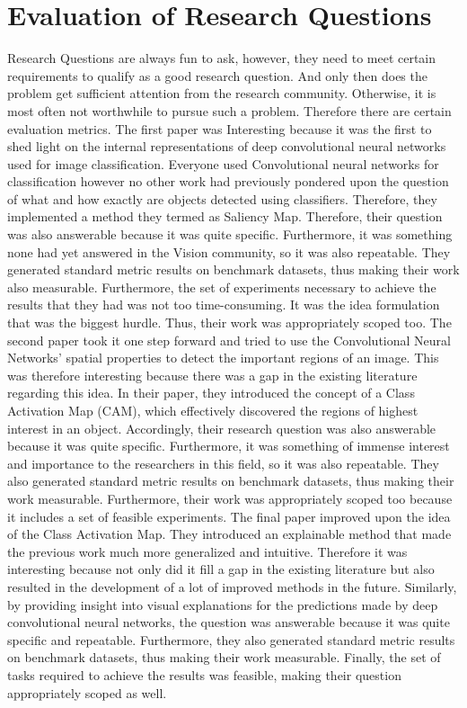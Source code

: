 \documentclass[11pt]{article}
\begin{document}
\section{Evaluation of Research Questions}
Research Questions are always fun to ask, however, they need to meet certain requirements to qualify as a good research question. And only then does the problem get sufficient attention from the research community. Otherwise, it is most often not worthwhile to pursue such a problem. Therefore there are certain evaluation metrics. \newline
The first paper was Interesting because it was the first to shed light on the internal representations of deep convolutional neural networks used for image classification. Everyone used Convolutional neural networks for classification however no other work had previously pondered upon the question of what and how exactly are objects detected using classifiers. Therefore, they implemented a method they termed as Saliency Map. Therefore, their question was also answerable because it was quite specific. Furthermore, it was something none had yet answered in the Vision community, so it was also repeatable. They generated standard metric results on benchmark datasets, thus making their work also measurable. Furthermore, the set of experiments necessary to achieve the results that they had was not too time-consuming. It was the idea formulation that was the biggest hurdle. Thus, their work was appropriately scoped too. \newline
The second paper took it one step forward and tried to use the Convolutional Neural Networks' spatial properties to detect the important regions of an image.  This was therefore interesting because there was a gap in the existing literature regarding this idea. In their paper, they introduced the concept of a Class Activation Map (CAM), which effectively discovered the regions of highest interest in an object. Accordingly, their research question was also answerable because it was quite specific. Furthermore, it was something of immense interest and importance to the researchers in this field, so it was also repeatable. They also generated standard metric results on benchmark datasets, thus making their work measurable. Furthermore, their work was appropriately scoped too because it includes a set of feasible experiments. \newline
The final paper improved upon the idea of the Class Activation Map. They introduced an explainable method that made the previous work much more generalized and intuitive. Therefore it was interesting because not only did it fill a gap in the existing literature but also resulted in the development of a lot of improved methods in the future. Similarly, by providing insight into visual explanations for the predictions made by deep convolutional neural networks, the question was answerable because it was quite specific and repeatable. Furthermore, they also generated standard metric results on benchmark datasets, thus making their work measurable. Finally, the set of tasks required to achieve the results was feasible, making their question appropriately scoped as well.
\end{document}
